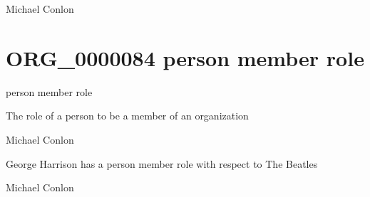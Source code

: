 \documentclass[letterpaper,10pt,english]{sphinxmanual}
\begin{document}
\begin{sphinxShadowBox}

\sphinxAtStartPar
Michael Conlon 
\end{sphinxShadowBox}
\begin{quote}
\label{\detokenize{doc-ORG_0000084:org-0000084}}\label{\detokenize{doc-ORG_0000084:person-member-role}}\label{\detokenize{doc-ORG_0000084:org-0000084}}
\ignorespaces \end{quote}


\section{ORG\_0000084 \sphinxhyphen{} person member role}
\label{\detokenize{doc-ORG_0000084:org-0000084-person-member-role}}\label{\detokenize{doc-ORG_0000084:index-0}}\label{\detokenize{doc-ORG_0000084::doc}}
\begin{sphinxShadowBox}

\sphinxAtStartPar
person member role
\end{sphinxShadowBox}

\begin{sphinxShadowBox}

\sphinxAtStartPar
The role of a person to be a member of an organization
\end{sphinxShadowBox}

\begin{sphinxShadowBox}

\sphinxAtStartPar
Michael Conlon 
\end{sphinxShadowBox}

\begin{sphinxShadowBox}

\sphinxAtStartPar
George Harrison has a person member role with respect to The Beatles
\end{sphinxShadowBox}

\begin{sphinxShadowBox}

\sphinxAtStartPar
Michael Conlon 
\end{sphinxShadowBox}
\begin{quote}
\label{\detokenize{doc-ORG_0000085:org-0000085}}\label{\detokenize{doc-ORG_0000085:person-member-grantor-role}}\label{\detokenize{doc-ORG_0000085:org-0000085}}
\ignorespaces \end{quote}
\end{document}
